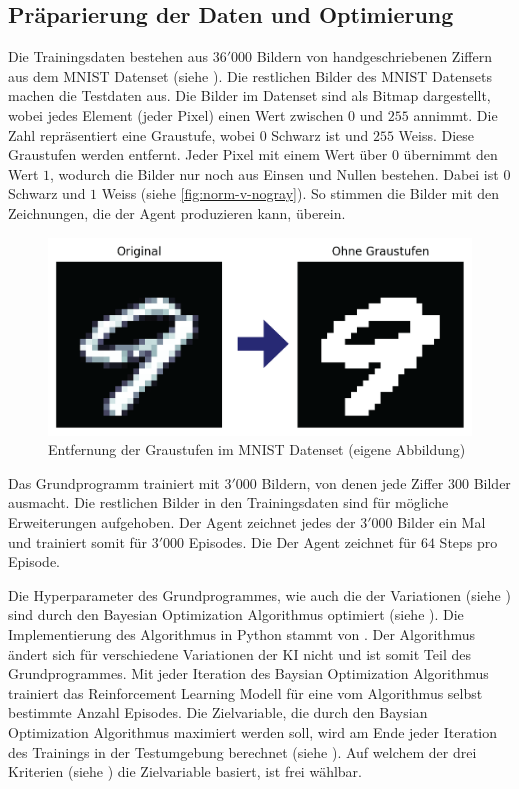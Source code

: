 \subsection{Präparierung der Daten und Optimierung}\label{sub:m_grund_data}
Die Trainingsdaten bestehen aus $36'000$ Bildern von handgeschriebenen Ziffern
aus dem MNIST Datenset (siehe ). Die restlichen Bilder des
MNIST Datensets machen die Testdaten aus. Die Bilder im Datenset sind als Bitmap
dargestellt, wobei jedes Element (jeder Pixel) einen Wert zwischen $0$ und $255$
annimmt. Die Zahl repräsentiert eine Graustufe, wobei $0$ Schwarz ist und $255$
Weiss. Diese Graustufen werden entfernt. Jeder Pixel mit einem Wert über $0$
übernimmt den Wert $1$, wodurch die Bilder nur noch aus Einsen und Nullen
bestehen. Dabei ist $0$ Schwarz und $1$ Weiss (siehe \autoref{fig:norm-v-nogray}).
So stimmen die Bilder mit den Zeichnungen, die der Agent produzieren kann,
überein.

\begin{figure}[!ht]
  \centering
  \includegraphics[width=\textwidth]{images/methode/norm-v-nogray.png}
  \caption{Entfernung der Graustufen im MNIST Datenset (eigene Abbildung)}
  \label{fig:norm-v-nogray}
\end{figure}


Das Grundprogramm trainiert mit $3'000$ Bildern, von denen jede Ziffer $300$
Bilder ausmacht. Die restlichen Bilder in den Trainingsdaten sind für mögliche  
Erweiterungen aufgehoben. Der Agent zeichnet jedes der $3'000$ Bilder ein Mal und
trainiert somit für $3'000$ Episodes. Die Der Agent zeichnet für $64$ Steps pro
Episode.

Die Hyperparameter des Grundprogrammes, wie auch die der Variationen (siehe
) sind durch den Bayesian Optimization Algorithmus
optimiert (siehe ). Die Implementierung des
Algorithmus in Python stammt von \cite{fernando_nogueira_bayesian_2014}. Der
Algorithmus ändert sich für verschiedene Variationen der KI nicht und ist somit
Teil des Grundprogrammes. Mit jeder Iteration des Baysian Optimization
Algorithmus trainiert das Reinforcement Learning Modell für eine vom Algorithmus
selbst bestimmte Anzahl Episodes. Die Zielvariable, die durch den Baysian
Optimization Algorithmus maximiert werden soll, wird am Ende jeder Iteration des
Trainings in der Testumgebung berechnet (siehe ).
Auf welchem der drei Kriterien (siehe ) die Zielvariable
basiert, ist frei wählbar.




